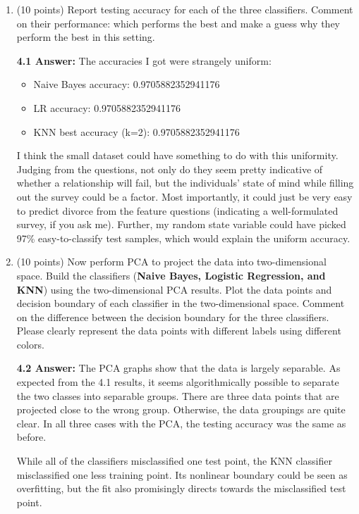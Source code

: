 \documentclass[12pt]{article}
\begin{document}
\begin{enumerate}

	\item (10 points) Report testing accuracy for each of the three classifiers.  Comment on their performance: which performs the best and make a guess why they perform the best in this setting.
	
    {\bf 4.1 Answer:} The accuracies I got were strangely uniform:
    \begin{itemize}
        \item Naive Bayes accuracy: 0.9705882352941176
        \item LR accuracy: 0.9705882352941176
        \item KNN best accuracy (k=2): 0.9705882352941176
    \end{itemize}

    I think the small dataset could have something to do with this uniformity. Judging from the questions, not only do they seem pretty indicative of whether a relationship will fail, but the individuals' state of mind while filling out the survey could be a factor. Most importantly, it could just be very easy to predict divorce from the feature questions (indicating a well-formulated survey, if you ask me). Further, my random state variable could have picked 97\% easy-to-classify test samples, which would explain the uniform accuracy.

	\item (10 points) Now perform PCA to project the data into two-dimensional space. Build the classifiers  ({\bf Naive Bayes, Logistic Regression, and KNN}) using the two-dimensional PCA results. Plot the data points and decision boundary of each classifier in the two-dimensional space. Comment on the difference between the decision boundary for the three classifiers. Please clearly represent the data points with different labels using different colors.
	
    {\bf 4.2 Answer:} The PCA graphs show that the data is largely separable. As expected from the 4.1 results, it seems algorithmically possible to separate the two classes into separable groups. There are three data points that are projected close to the wrong group. Otherwise, the data groupings are quite clear. In all three cases with the PCA, the testing accuracy was the same as before.

    While all of the classifiers misclassified one test point, the KNN classifier misclassified one less training point. Its nonlinear boundary could be seen as overfitting, but the fit also promisingly directs towards the misclassified test point.
    

\end{enumerate}
\end{document}
